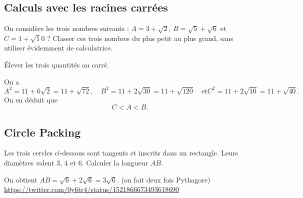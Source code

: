\subsection{Calculs avec les racines carrées}

\begin{exo}

On considère les trois nombres suivants : $A=3+\sqrt 2$, $B=\sqrt 5 +\sqrt 6$ et $C=1+\sqrt 10$ ?
Classer ces trois nombres du plus petit au plus grand, sans utiliser évidemment de calculatrice.
\begin{hint}
Élever les trois quantités au carré.
\end{hint}
\begin{sol}
On a 
\[
A^2 = 11+6\sqrt 2 = 11+\sqrt{72},\quad
B^2 = 11+2\sqrt{30}=11+\sqrt{120} \quad\text{et}
C^2 = 11+2\sqrt{10}=11+\sqrt{40}.\]
On en déduit que 
\[ C< A < B.\]
\end{sol}
\end{exo}






\subsection{Circle Packing}

\begin{exo}
Les trois cercles ci-dessous sont tangents et inscrits dans un rectangle. Leurs diamètres valent $3$, $4$ et $6$.
Calculer la longueur $AB$.
\begin{center}
\end{center}
\begin{hint}
\end{hint}
\begin{sol}
On obtient $AB=\sqrt 6 + 2\sqrt 6 = 3\sqrt 6$. (on fait deux fois Pythagore)
\url{https://twitter.com/0y6tr4/status/1521866673493618690} 
\end{sol}
\end{exo}



